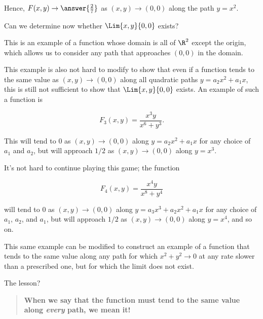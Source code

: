\documentclass{ximera}
\begin{document}
\begin{exercise}
\begin{exercise}
 Hence, $F(x,y) \to \answer{\frac{2}{7}}$ as $(x,y) \to (0,0)$ along the path $y=x^2$.

Can we determine now whether $\Lim{x,y}{0,0}$ exists?
 
\begin{multipleChoice}
\end{multipleChoice}

\begin{remark}
This is an example of a function whose domain is all of $\R^2$ except the origin, which allows us to consider any path that approaches $(0,0)$ in the domain.

This example is also not hard to modify to show that even if a function tends to the same value as $(x,y) \to (0,0)$ along all quadratic paths $y=a_2x^2+a_1x$, this is still not sufficient to show that  $\Lim{x,y}{0,0}$ exists.  An example of such a function is 

\[
F_3(x,y) = \frac{x^3y}{x^6+y^3}.
\]

This will tend to $0$ as $(x,y) \to (0,0)$ along $y=a_2x^2+a_1x$ for any choice of $a_1$ and $a_2$, but will approach $1/2$ as $(x,y) \to (0,0)$ along $y=x^3$.

It's not hard to continue playing this game; the function

\[
F_4(x,y) = \frac{x^4y}{x^8+y^4}
\]

will tend to $0$ as $(x,y) \to (0,0)$ along $y=a_3x^3+a_2x^2+a_1x$ for any choice of $a_1$, $a_2$, and $a_1$, but will approach $1/2$ as $(x,y) \to (0,0)$ along $y=x^4$, and so on.

This same example can be modified to construct an example of a function that tends to the same value along any path for which $x^2+y^2 \to 0$ at any rate slower than a prescribed one, but for which the limit does not exist.

The lesson?

\begin{quote}
\textbf{When we say that the function must tend to the same value along \emph{every} path, we mean it!}
\end{quote}
\end{remark}

 \end{exercise}
 \end{exercise}
\end{document}
